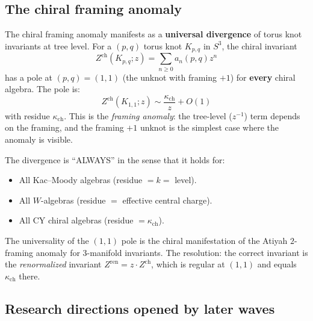\documentclass[11pt]{article}
\begin{document}
\subsection{The chiral framing anomaly}
\label{subsec:chiral-framing-anomaly}

\begin{warning}
\label{warn:framing-anomaly-torus}
The chiral framing anomaly manifests as a \textbf{universal divergence}
of torus knot invariants at tree level. For a $(p, q)$ torus knot
$K_{p,q}$ in $S^3$, the chiral invariant
\[
 Z^{\mathrm{ch}}(K_{p,q}; z) = \sum_{n \geq 0} a_n(p,q) z^n
\]
has a pole at $(p, q) = (1, 1)$ (the unknot with framing $+1$) for
\textbf{every} chiral algebra. The pole is:
\[
 Z^{\mathrm{ch}}(K_{1,1}; z) \sim \frac{\kappa_{\mathrm{ch}}}{z} + O(1)
\]
with residue $\kappa_{\mathrm{ch}}$. This is the \emph{framing anomaly}:
the tree-level ($z^{-1}$) term depends on the framing, and the
framing $+1$ unknot is the simplest case where the anomaly is visible.

The divergence is ``ALWAYS'' in the sense that it holds for:
\begin{itemize}
 \item All Kac--Moody algebras (residue $= k = $ level).
 \item All $W$-algebras (residue $= $ effective central charge).
 \item All CY chiral algebras (residue $= \kappa_{\mathrm{ch}}$).
\end{itemize}
The universality of the $(1,1)$ pole is the chiral manifestation
of the Atiyah $2$-framing anomaly for $3$-manifold invariants.
The resolution: the correct invariant is the \emph{renormalized}
invariant $Z^{\mathrm{ren}} = z \cdot Z^{\mathrm{ch}}$, which is
regular at $(1,1)$ and equals $\kappa_{\mathrm{ch}}$ there.
\end{warning}

\subsection{Research directions opened by later waves}
\label{subsec:later-research-directions}
\end{document}
